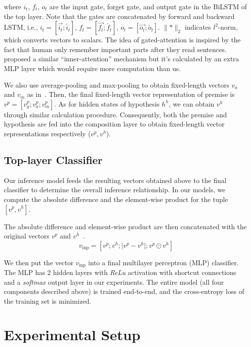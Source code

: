\documentclass[11pt,letterpaper]{article}
\begin{document}
\noindent where $i_t$, $f_t$, $o_t$ are the input gate, forget gate, and output gate in the BiLSTM of the top layer. Note that the gates are concatenated by forward and backward LSTM, i.e., $i_t=[\overrightarrow{i_t};\overleftarrow{i_t}]$, $f_t=[\overrightarrow{f_t};\overleftarrow{f_t}]$, $o_t=[\overrightarrow{o_t};\overleftarrow{o_t}]$. $\lVert*\rVert_2$ indicates $l^2$-norm, which converts vectors to scalars. The idea of gated-attention is inspired by the fact that human only remember important parts after they read sentences.~\citep{DBLP:journals/corr/LiuSLW16,DBLP:journals/corr/LinFSYXZB17} proposed a similar ``inner-attention'' mechanism but it's calculated by an extra MLP layer which would require more computation than us.

We also use average-pooling and max-pooling to obtain fixed-length vectors $v_a$ and $v_m$ as in~\citet{DBLP:journals/corr/ChenZLWJ16}. Then, the final fixed-length vector representation of premise is $v^p = [v^p_g;v^p_a;v^p_m]$. As for hidden states of hypothesis $h^h$, we can obtain $v^h$ through similar calculation procedure. Consequently, both the premise and hypothesis are fed into the composition layer to obtain fixed-length vector representations respectively ($v^p, v^h$).

\subsection{Top-layer Classifier}
Our inference model feeds the resulting vectors obtained above to the final classifier to determine the overall inference relationship. In our models, we compute the absolute difference and the element-wise product for the tuple $[v^p, v^h]$. 

The absolute difference and element-wise product are then concatenated with the original vectors $v^p$ and $v^h$~\citep{Mou:P16-2022}. 
\begin{equation}
v_{\text{inp}} = [v^p; v^h; \lvert v^p-v^h \rvert ; v^p \odot v^h]
\end{equation}

We then put the vector $v_{\text{inp}}$ into a final multilayer perceptron (MLP) classifier. The MLP has 2 hidden layers with \textit{ReLu} activation with shortcut connections and a \textit{softmax} output layer in our experiments. The entire model (all four components described above) is trained end-to-end, and the cross-entropy loss of the training set is minimized. 

\section{Experimental Setup}
\end{document}
